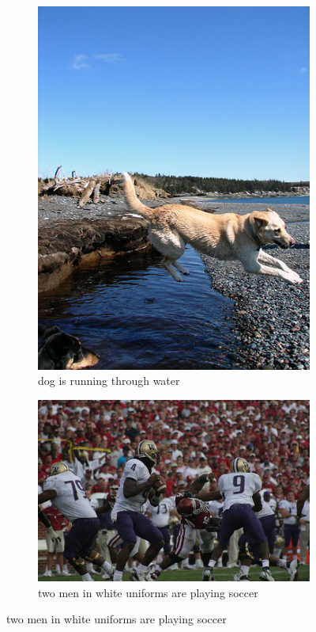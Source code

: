 \begin{figure}[h]
\centering
\begin{subfigure}[b]{.45\linewidth}
\includegraphics[width=\linewidth]{./files/dog_jumping.jpg}
	\caption{dog is running through water}
\end{subfigure}
\begin{subfigure}[b]{.45\linewidth}
	\includegraphics[width=\linewidth]{./files/football.jpg}
	\caption{two men in white uniforms are playing soccer}
\end{subfigure}


\end{figure}
